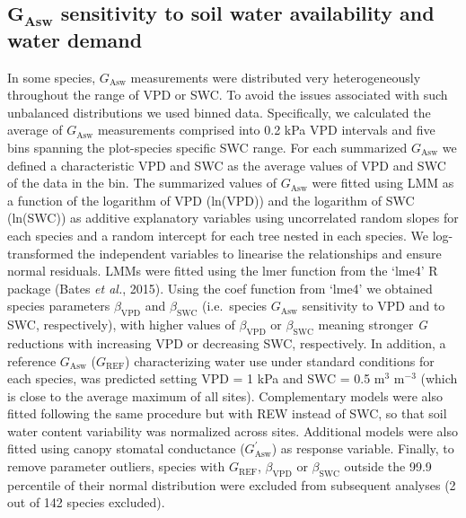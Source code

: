 \documentclass[11pt,twoside]{reedthesis}
\begin{document}
\subsection{\texorpdfstring{\(\textbf{G}_{\textbf{Asw}}\) sensitivity to
soil water availability and water
demand}{\textbackslash{}textbf\{G\}\_\{\textbackslash{}textbf\{Asw\}\} sensitivity to soil water availability and water demand}}\label{textbfg_textbfasw-sensitivity-to-soil-water-availability-and-water-demand}

In some species, \(G_{\text{Asw}}\) measurements were distributed very
heterogeneously throughout the range of VPD or SWC. To avoid the issues
associated with such unbalanced distributions we used binned data.
Specifically, we calculated the average of \(G_{\text{Asw}}\)
measurements comprised into 0.2 kPa VPD intervals and five bins spanning
the plot-species specific SWC range. For each summarized
\(G_{\text{Asw}}\) we defined a characteristic VPD and SWC as the
average values of VPD and SWC of the data in the bin. The summarized
values of \(G_{\text{Asw}}\) were fitted using LMM as a function of the
logarithm of VPD (ln(VPD)) and the logarithm of SWC (ln(SWC)) as
additive explanatory variables using uncorrelated random slopes for each
species and a random intercept for each tree nested in each species. We
log-transformed the independent variables to linearise the relationships
and ensure normal residuals. LMMs were fitted using the lmer function
from the `lme4' R package (Bates \emph{et al.}, 2015). Using the coef
function from `lme4' we obtained species parameters
\(\beta_{\text{VPD}}\) and \(\beta_{\text{SWC}}\) (i.e.~species
\(G_{\text{Asw}}\) sensitivity to VPD and to SWC, respectively), with
higher values of \(\beta_{\text{VPD}}\) or \(\beta_{\text{SWC}}\)
meaning stronger \emph{G} reductions with increasing VPD or decreasing
SWC, respectively. In addition, a reference \(G_{\text{Asw}}\)
(\(G_{\text{REF}}\)) characterizing water use under standard conditions
for each species, was predicted setting VPD = 1 kPa and SWC = 0.5
\(\text{m}^3\) \(\text{m}^{-3}\) (which is close to the average maximum
of all sites). Complementary models were also fitted following the same
procedure but with REW instead of SWC, so that soil water content
variability was normalized across sites. Additional models were also
fitted using canopy stomatal conductance (\(G_{\text{Asw}}^{'}\)) as
response variable. Finally, to remove parameter outliers, species with
\(G_{\text{REF}}\), \(\beta_{\text{VPD}}\) or \(\beta_{\text{SWC}}\)
outside the 99.9 percentile of their normal distribution were excluded
from subsequent analyses (2 out of 142 species excluded).\par
\end{document}
